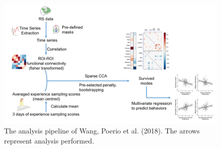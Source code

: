 \begin{figure}[H]
    \centering
    \includegraphics[width=1\textwidth]{cca/image/ccafig3.png}
    \caption{The analysis pipeline of Wang, Poerio et al. (2018). The arrows represent analysis performed.}

    \label{fig:methods:fig3}
\end{figure}
